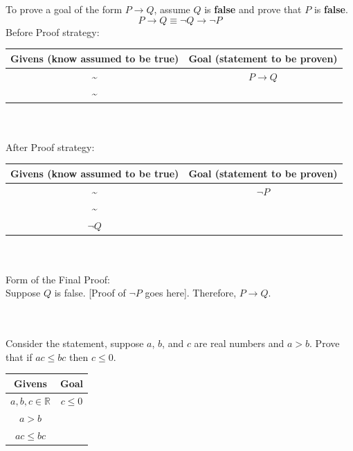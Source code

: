 \documentclass[../setup.tex]{subfiles}
\begin{document}
\begin{theorem}
	To prove a goal of the form $P \rightarrow Q$, assume $Q$ is \textbf{false} and prove that $P$ is \textbf{false}.
	\[P \rightarrow Q \equiv \lnot Q \rightarrow \lnot P\]
	Before Proof strategy:
	\begin{center}
	\begin{tabular}[t]{| c | c |}
		\hline
		Givens (know assumed to be true) & Goal (statement to be proven) \\
		\hline
		\textasciitilde & $P \rightarrow Q$ \\
		\textasciitilde & \\
		\hline
	\end{tabular}
	\end{center}
	\phantom \\ \\
	After Proof strategy:
	\begin{center}
	\begin{tabular}[t]{| c | c |}
		\hline
		Givens (know assumed to be true) & Goal (statement to be proven) \\
		\hline
		\textasciitilde & $\lnot P$ \\
		\textasciitilde & \\
		$\lnot Q$ & \\
		\hline
	\end{tabular}
	\end{center}
	\phantom \\ \\
	Form of the Final Proof: \\
	Suppose $Q$ is false. [Proof of $\lnot P$ goes here]. Therefore, $P \rightarrow Q$.
\end{theorem}
\phantom \\ \\
Consider the statement, suppose $a$, $b$, and $c$ are real numbers and $a > b$. Prove that if $ac \leq bc$ then $c \leq 0$. \\
\begin{center}
	\begin{tabular}[t]{| c | c |}
		\hline
		Givens  & Goal  \\
		\hline
		$a, b, c \in \mathbb{R}$ & $c \leq 0$\\
		$a > b$ & \\
		$ ac \leq bc$ & \\
		\hline
	\end{tabular}
\end{center}
\phantom \\ \\
\end{document}
